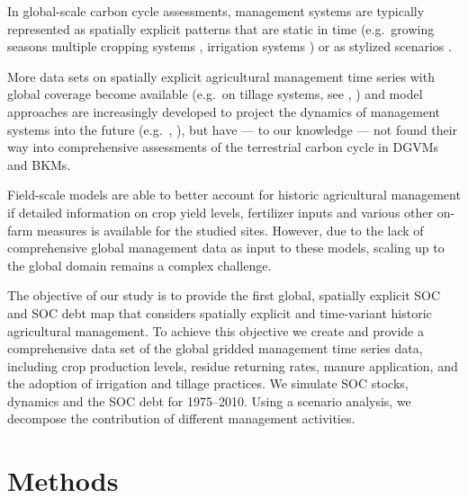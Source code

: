 \documentclass[gc, manuscript]{copernicus}
\begin{document}
In global-scale carbon cycle assessments, management systems are typically represented as spatially explicit patterns that are static in time (e.g.~growing seasons \citep{portmann_mirca2000global_2010} multiple cropping systems \citep{waha_multiple_2020}, irrigation systems \citep{jagermeyr_water_2015}) or as stylized scenarios \citep[e.g.~][\citet{lutz_simulating_2019}]{pugh_simulated_2015}.

More data sets on spatially explicit agricultural management time series with global coverage become available (e.g.~on tillage systems, see \citep{porwollik_generating_2018}, \citep{prestele_spatially_2018}) and model approaches are increasingly developed to project the dynamics of management systems into the future (e.g.~\citep{iizumi_modeling_2019}, \citep{minoli_modelling_2019}), but have --- to our knowledge --- not found their way into comprehensive assessments of the terrestrial carbon cycle in DGVMs and BKMs.

Field-scale models \citep[\citet{coleman_simulating_1997}, \citet{smith_estimating_2010}, \citet{taghizadeh-toosi_c-tool_2014}]{del_grosso_simulated_2001} are able to better account for historic agricultural management if detailed information on crop yield levels, fertilizer inputs and various other on-farm measures is available for the studied sites. However, due to the lack of comprehensive global management data as input to these models, scaling up to the global domain remains a complex challenge.

The objective of our study is to provide the first global, spatially explicit SOC and SOC debt map that considers spatially explicit and time-variant historic agricultural management. To achieve this objective we create and provide a comprehensive data set of the global gridded management time series data, including crop production levels, residue returning rates, manure application, and the adoption of irrigation and tillage practices. We simulate SOC stocks, dynamics and the SOC debt for 1975--2010. Using a scenario analysis, we decompose the contribution of different management activities.
\newpage

\hypertarget{methods}{%
\section{Methods}\label{methods}}
\end{document}
